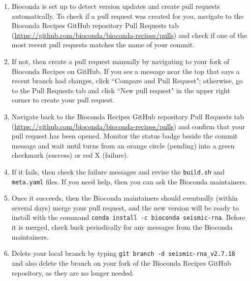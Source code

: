 \documentclass[main.tex]{subfiles}
\begin{document}
\begin{enumerate}
    \item Bioconda is set up to detect version updates and create pull requests automatically. To check if a pull request was created for you, navigate to the Bioconda Recipes GitHub repository Pull Requests tab (\url{https://github.com/bioconda/bioconda-recipes/pulls}) and check if one of the most recent pull requests matches the name of your commit.
    \item If not, then create a pull request manually by navigating to your fork of Bioconda Recipes on GitHub. If you see a message near the top that says a recent branch had changes, click ``Compare and Pull Request"; otherwise, go to the Pull Requests tab and click ``New pull request" in the upper right corner to create your pull request.
    \item Navigate back to the Bioconda Recipes GitHub repository Pull Requests tab (\url{https://github.com/bioconda/bioconda-recipes/pulls}) and confirm that your pull request has been opened. Monitor the status badge beside the commit message and wait until turns from an orange circle (pending) into a green checkmark (success) or red X (failure).
    \item If it fails, then check the failure messages and revise the \verb|build.sh| and \verb|meta.yaml| files. If you need help, then you can ask the Bioconda maintainers.
    \item Once it succeeds, then the Bioconda maintainers should eventually (within several days) merge your pull request, and the new version will be ready to install with the command \verb|conda install -c bioconda seismic-rna|. Before it is merged, check back periodically for any messages from the Bioconda maintainers.
    \item Delete your local branch by typing \verb|git branch -d seismic-rna_v2.7.18| and also delete the branch on your fork of the Bioconda Recipes GitHub repository, as they are no longer needed.
        
\end{enumerate}
\end{document}
